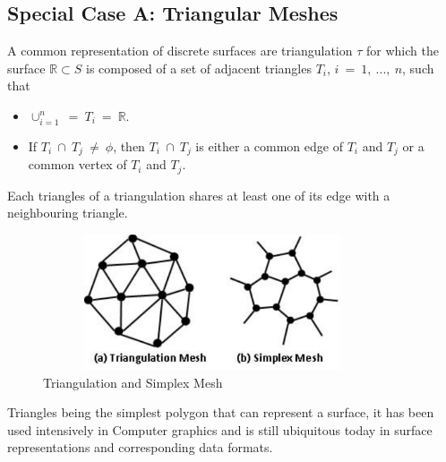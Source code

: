 \documentclass{InsightArticle}
\begin{document}
\subsection{Special Case A: Triangular Meshes}
A common representation of discrete surfaces are triangulation $\tau$ for which the surface $\mathbb{R} \subset S$ is composed of a set of adjacent triangles $T_i$, $i~=~1,~... ,~n$, such that 
\begin{itemize}
	\item $\cup_{i=1}^n~=~T_i~=~\mathbb{R}$.
	\item If $T_i~\cap~T_j~\neq~\phi$, then $T_i~\cap~T_j$ is either a common edge of $T_i$ and $T_j$ or a common vertex of $T_i$ and $T_j$. 
\end{itemize}
Each triangles of a triangulation shares at least one of its edge with a neighbouring triangle.
\begin{figure}[!t]
	\centering
	\includegraphics[width=100mm, height=40mm]{TriangulationSimplexMesh}
	\caption{Triangulation and Simplex Mesh}
	\label{fig:triangulationSimplexMesh}
\end{figure}
Triangles being the simplest polygon that can represent a surface, it has been used intensively in Computer graphics and is still ubiquitous today in surface representations and corresponding data formats.

\end{document}
